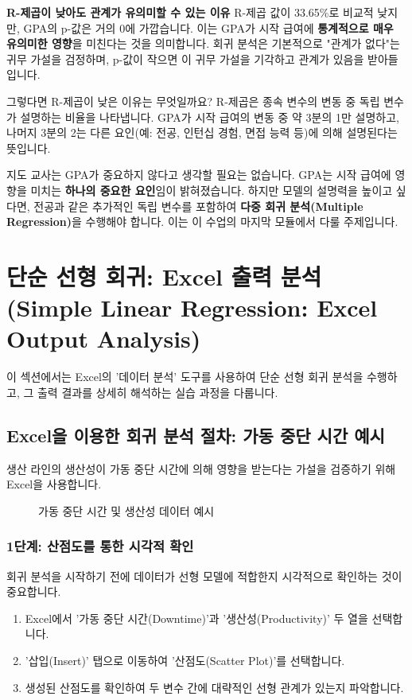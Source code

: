 \documentclass[11pt,a4paper]{book}
\theoremstyle{definition}
\begin{document}
\begin{cautionbox}
\textbf{R-제곱이 낮아도 관계가 유의미할 수 있는 이유}
R-제곱 값이 33.65\%로 비교적 낮지만, GPA의 p-값은 거의 0에 가깝습니다. 이는 GPA가 시작 급여에 \textbf{통계적으로 매우 유의미한 영향}을 미친다는 것을 의미합니다. 회귀 분석은 기본적으로 "관계가 없다"는 귀무 가설을 검정하며, p-값이 작으면 이 귀무 가설을 기각하고 관계가 있음을 받아들입니다.

그렇다면 R-제곱이 낮은 이유는 무엇일까요? R-제곱은 종속 변수의 변동 중 독립 변수가 설명하는 비율을 나타냅니다. GPA가 시작 급여의 변동 중 약 3분의 1만 설명하고, 나머지 3분의 2는 다른 요인(예: 전공, 인턴십 경험, 면접 능력 등)에 의해 설명된다는 뜻입니다.

지도 교사는 GPA가 중요하지 않다고 생각할 필요는 없습니다. GPA는 시작 급여에 영향을 미치는 \textbf{하나의 중요한 요인}임이 밝혀졌습니다. 하지만 모델의 설명력을 높이고 싶다면, 전공과 같은 추가적인 독립 변수를 포함하여 \textbf{다중 회귀 분석(Multiple Regression)}을 수행해야 합니다. 이는 이 수업의 마지막 모듈에서 다룰 주제입니다.
\end{cautionbox}


\section{단순 선형 회귀: Excel 출력 분석 (Simple Linear Regression: Excel Output Analysis)}
이 섹션에서는 Excel의 '데이터 분석' 도구를 사용하여 단순 선형 회귀 분석을 수행하고, 그 출력 결과를 상세히 해석하는 실습 과정을 다룹니다.

\subsection{Excel을 이용한 회귀 분석 절차: 가동 중단 시간 예시}
생산 라인의 생산성이 가동 중단 시간에 의해 영향을 받는다는 가설을 검증하기 위해 Excel을 사용합니다.

\begin{figure}[h!]
    \centering
    \caption{가동 중단 시간 및 생산성 데이터 예시}
    \label{fig:downtime_data}
\end{figure}

\subsubsection{1단계: 산점도를 통한 시각적 확인}
회귀 분석을 시작하기 전에 데이터가 선형 모델에 적합한지 시각적으로 확인하는 것이 중요합니다.
\begin{enumerate}
    \item Excel에서 '가동 중단 시간(Downtime)'과 '생산성(Productivity)' 두 열을 선택합니다.
    \item '삽입(Insert)' 탭으로 이동하여 '산점도(Scatter Plot)'를 선택합니다.
    \item 생성된 산점도를 확인하여 두 변수 간에 대략적인 선형 관계가 있는지 파악합니다.
\end{enumerate}
\end{document}
